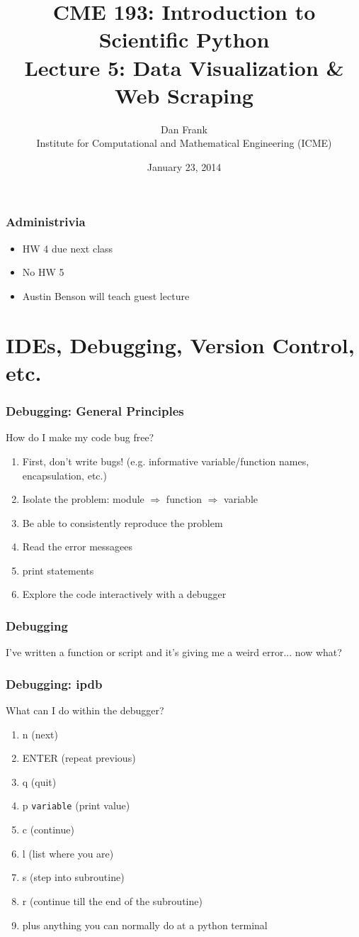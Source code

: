 \documentclass{beamer}
\title{CME 193: Introduction to Scientific Python \\
Lecture 5: Data Visualization \& Web Scraping}
\author{
Dan Frank \\
\vspace{0.1in}
Institute for Computational and Mathematical Engineering (ICME)}
\date{January 23, 2014}
\begin{document}
\maketitle

\begin{frame}
\frametitle{Administrivia}
\begin{itemize} 
\setlength{\itemsep}{0.1in}
\item{HW 4 due next class }
\item{No HW 5}
\item{Austin Benson will teach guest lecture}
\end{itemize}
\end{frame}




\section{IDEs, Debugging, Version Control, etc.} 

\begin{frame}
\frametitle{Debugging: General Principles}
How do I make my code bug free?
\begin{enumerate}
\item First, don't write bugs! (e.g. informative variable/function names, encapsulation, etc.)
\item Isolate the problem: module $\Rightarrow$ function $\Rightarrow$ variable
\item Be able to consistently reproduce the problem
\item Read the error messagees
\item print statements  
\item Explore the code interactively with a debugger
\end{enumerate}
\end{frame}

\begin{frame}
\frametitle{Debugging}
I've written a function or script and it's giving me a weird error... now what?
\end{frame}

\begin{frame}
\frametitle{Debugging: ipdb}
What can I do within the debugger?
\begin{enumerate}
\item n (next)
\item ENTER (repeat previous)
\item q (quit)
\item p \texttt{variable} (print value)
\item c (continue)
\item l (list where you are)
\item s (step into subroutine)
\item r (continue till the end of the subroutine)
\item plus anything you can normally do at a python terminal
\end{enumerate}
\end{frame}
\end{document}
